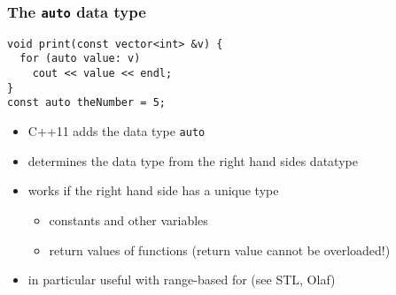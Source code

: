 \documentclass{slides}
\begin{document}
\begin{frame}[fragile]
  \frametitle{The \lstinline!auto! data type}

\begin{lstlisting}
void print(const vector<int> &v) {
  for (auto value: v) 
    cout << value << endl;
}
const auto theNumber = 5;
\end{lstlisting}

  \begin{itemize}
  \item C++11 adds the data type \lstinline!auto!
  \item determines the data type from the right hand sides datatype
  \item works if the right hand side has a unique type
    \begin{itemize}
    \item constants and other variables
    \item return values of functions (return value cannot be overloaded!)
    \end{itemize}
  \item in particular useful with range-based for (see STL, Olaf)
  \end{itemize}
\end{frame}
\end{document}
